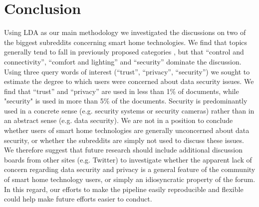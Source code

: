 \documentclass{article}
\begin{document}
    \section{Conclusion}
    Using LDA as our main methodology we investigated the discussions on two of the biggest subreddits concerning smart home technologies. We find that topics generally tend to fall in previously proposed categories \cite{hubert2020take}, but that “control and connectivity”, “comfort and lighting” and “security” dominate the discussion. Using three query words of interest (“trust”, “privacy”, “security”) we sought to estimate the degree to which users were concerned about data security issues. We find that “trust” and “privacy” are used in less than 1\% of documents, while "security" is used in more than 5\% of the documents. Security is predominantly used in a concrete sense (e.g. security systems or security cameras) rather than in an abstract sense (e.g. data security). We are not in a position to conclude whether users of smart home technologies are generally unconcerned about data security, or whether the subreddits are simply not used to discuss these issues. We therefore suggest that future research should include additional discussion boards from other sites (e.g. Twitter) to investigate whether the apparent lack of concern regarding data security and privacy is a general feature of the community of smart home technology users, or simply an idiosyncratic property of the forum. In this regard, our efforts to make the pipeline easily reproducible and flexible could help make future efforts easier to conduct. 
    

    
\end{document}
